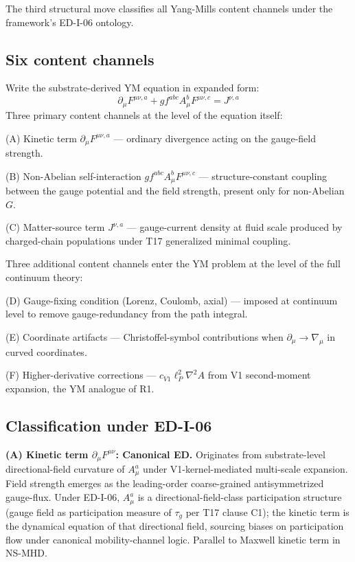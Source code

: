 \documentclass[11pt,a4paper]{article}
\begin{document}
The third structural move classifies all Yang-Mills content channels under the framework's ED-I-06 ontology.

\subsection{Six content channels}

Write the substrate-derived YM equation in expanded form:
\[
\partial_\mu F^{\mu\nu,a} + g f^{abc} A_\mu^b F^{\mu\nu,c} = J^{\nu,a}
\]
Three primary content channels at the level of the equation itself:

(A) Kinetic term $\partial_\mu F^{\mu\nu,a}$ --- ordinary divergence acting on the gauge-field strength.

(B) Non-Abelian self-interaction $g f^{abc} A_\mu^b F^{\mu\nu,c}$ --- structure-constant coupling between the gauge potential and the field strength, present only for non-Abelian $G$.

(C) Matter-source term $J^{\nu,a}$ --- gauge-current density at fluid scale produced by charged-chain populations under T17 generalized minimal coupling.

Three additional content channels enter the YM problem at the level of the full continuum theory:

(D) Gauge-fixing condition (Lorenz, Coulomb, axial) --- imposed at continuum level to remove gauge-redundancy from the path integral.

(E) Coordinate artifacts --- Christoffel-symbol contributions when $\partial_\mu \to \nabla_\mu$ in curved coordinates.

(F) Higher-derivative corrections --- $c_{V1} \ell_P^{2} \nabla^{2} A$ from V1 second-moment expansion, the YM analogue of R1.

\subsection{Classification under ED-I-06}

\textbf{(A) Kinetic term $\partial_\mu F^{\mu\nu}$: Canonical ED.} Originates from substrate-level directional-field curvature of $A_\mu^a$ under V1-kernel-mediated multi-scale expansion. Field strength emerges as the leading-order coarse-grained antisymmetrized gauge-flux. Under ED-I-06, $A_\mu^a$ is a directional-field-class participation structure (gauge field as participation measure of $\tau_g$ per T17 clause C1); the kinetic term is the dynamical equation of that directional field, sourcing biases on participation flow under canonical mobility-channel logic. Parallel to Maxwell kinetic term in NS-MHD.
\end{document}
